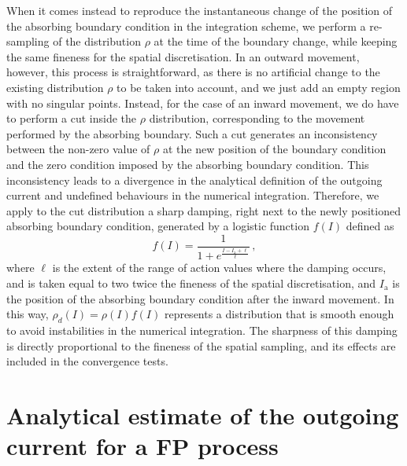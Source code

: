 When it comes instead to reproduce the instantaneous change of the position of the absorbing boundary condition in the integration scheme, we perform a re-sampling of the distribution $\rho$ at the time of the boundary change, while keeping the same fineness for the spatial discretisation. In an outward movement, however, this process is straightforward, as there is no artificial change to the existing distribution $\rho$ to be taken into account, and we just add an empty region with no singular points. Instead, for the case of an inward movement, we do have to perform a cut inside the $\rho$ distribution, corresponding to the movement performed by the absorbing boundary. Such a cut generates an inconsistency between the non-zero value of $\rho$ at the new position of the boundary condition and the zero condition imposed by the absorbing boundary condition. This inconsistency leads to a divergence in the analytical definition of the outgoing current and undefined behaviours in the numerical integration. Therefore, we apply to the cut distribution a sharp damping, right next to the newly positioned absorbing boundary condition, generated by a logistic function $f(I)$ defined as
\begin{equation}
    f(I) = \frac{1}{1 + e^{\frac{I-I_\text{a}+\ell}{\ell}}} \, , 
    \label{eq:logistic_damping}   
\end{equation}
where $\ell$ is the extent of the range of action values where the damping occurs, and is taken equal to two twice the fineness of the spatial discretisation, and $I_\text{a}$ is the position of the absorbing boundary condition after the inward movement. In this way, $\rho_d(I) = \rho(I) f(I)$ represents a distribution that is smooth enough to avoid instabilities in the numerical integration. The sharpness of this damping is directly proportional to the fineness of the spatial sampling, and its effects are included in the convergence tests.


\section{Analytical estimate of the outgoing current for a FP process}
\label{app_sec:analytic_estimate_of_the_current_loss}


